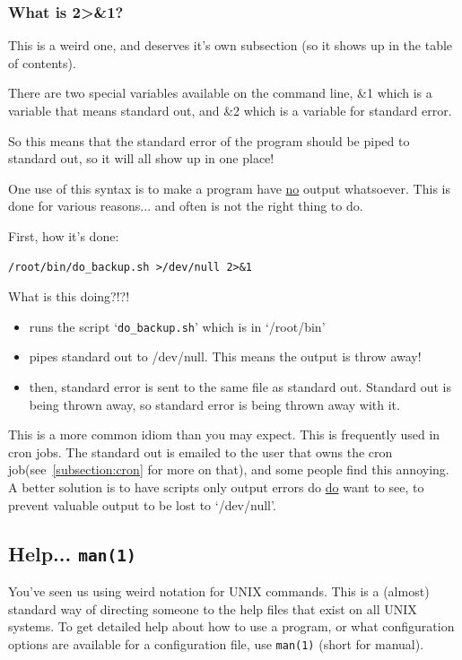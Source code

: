 \subsubsection{What is 2\textgreater\&1?}
This is a weird one, and deserves it's own subsection (so it shows up in the 
table of contents).

There are two special variables available on the command line, \&1
which is a variable that means standard out, and \&2 which is 
a variable for standard error. 

So this means that the standard error of the program should be 
piped to standard out, so it will all show up in one place!

One use of this syntax is to make a program have \underline{no} output
whatsoever. This is done for various reasons... and often is not the
right thing to do.

First, how it's done:

\begin{verbatim}
/root/bin/do_backup.sh >/dev/null 2>&1
\end{verbatim}

What is this doing?!?!

\begin{itemize}
\item runs the script `{\tt do\_backup.sh}' which is in `/root/bin'
\item pipes standard out to /dev/null. This means the output is throw away!
\item then, standard error is sent to the same file as standard out. Standard
out is being thrown away, so standard error is being thrown away with it.
\end{itemize}

This is a more common idiom than you may expect. This is frequently used in
cron jobs. The standard out is emailed to the user that owns the cron
job(see~\ref{subsection:cron} for more on that), and some people find this
annoying. A better solution is to have scripts only output errors do \underline{do}
want to see, to prevent valuable output to be lost to `/dev/null'.

\subsection {Help... {\tt man(1)}}
You've seen us using weird notation for UNIX commands. This is a (almost) standard
way of directing someone to the help files that exist on all UNIX systems. 
To get detailed help about how to use a program, or what configuration
options are available for a configuration file, use {\tt man(1)} (short for manual).

